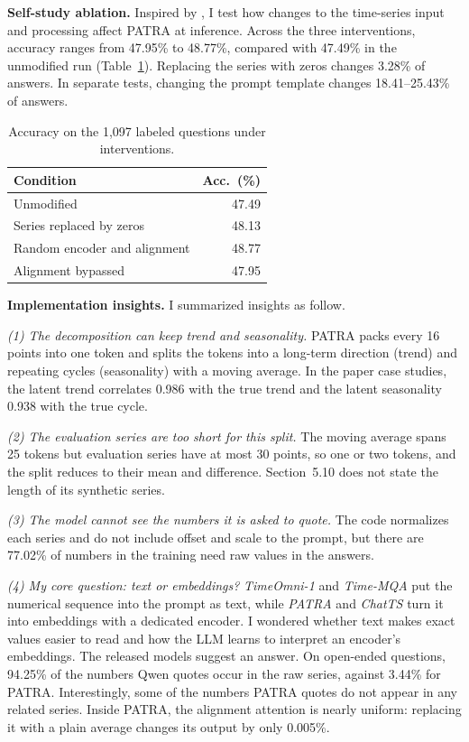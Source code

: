 \documentclass{article}
\begin{document}
\textbf{Self-study ablation.}
Inspired by \citet{chen2026evidence}, I test how changes to the
time-series input and processing affect PATRA at inference.
Across the three interventions, accuracy ranges from 47.95\% to 48.77\%,
compared with 47.49\% in the unmodified run (Table~\ref{tab:ablation}).
Replacing the series with zeros changes 3.28\% of answers.
In separate tests, changing the prompt template changes 18.41--25.43\%
of answers.

\begin{table}[!t]
\caption{Accuracy on the 1,097 labeled questions under interventions.}
\label{tab:ablation}
\vskip 0.05in
\centering
\small
\begin{tabular*}{\columnwidth}{@{\extracolsep{\fill}}lr@{}}
\toprule
Condition & Acc.\ (\%) \\
\midrule
Unmodified & 47.49 \\ 
Series replaced by zeros & 48.13 \\
Random encoder and alignment & 48.77 \\
Alignment bypassed & 47.95 \\
\bottomrule
\end{tabular*}
\vskip -0.1in
\end{table}


\textbf{Implementation insights.} I summarized insights as follow.

\emph{(1) The decomposition can keep trend and seasonality.}
PATRA packs every 16 points into one token and splits the tokens into a long-term direction (trend) and repeating cycles (seasonality) with a moving average.
In the paper case studies, the latent trend correlates 0.986 with the true trend and the latent seasonality 0.938 with the true cycle.

\emph{(2) The evaluation series are too short for this split.}
The moving average spans 25 tokens but evaluation series have at most 30 points, so one or two tokens, and the split reduces to their mean and difference. Section~5.10 does not state the length of its synthetic series.

\emph{(3) The model cannot see the numbers it is asked to quote.}
The code normalizes each series and do not include offset and scale to the prompt, but there are 77.02\% of numbers in the training need raw values in the answers.

\emph{(4) My core question: text or embeddings?}
\emph{TimeOmni-1} and \emph{Time-MQA} put the numerical sequence into the prompt as text, while \emph{PATRA} and \emph{ChatTS} turn it into embeddings with a dedicated encoder. I wondered whether text makes exact values easier to read and how the LLM learns to interpret an encoder's embeddings.
The released models suggest an answer. On open-ended questions, 94.25\% of the numbers Qwen quotes occur in the raw series, against 3.44\% for PATRA. Interestingly, some of the numbers PATRA quotes do not appear in any related series. Inside PATRA, the alignment attention is nearly uniform: replacing it with a plain average changes its output by only 0.005\%.
\end{document}
